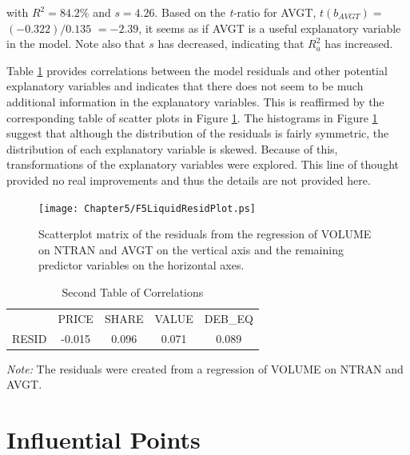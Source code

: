 \noindent with $R^2=84.2\%$ and $s=4.26$. Based on the
\textit{t-}ratio for AVGT, $t(b_{AVGT})=$ $(-0.322)/0.135$ $=-2.39$,
it seems as if AVGT is a useful explanatory variable in the model.
Note also that $s$ has decreased, indicating that $R_a^2$ has
increased.

Table \ref{T5:LiquidResidCorr2} provides correlations between the
model residuals and other potential explanatory variables and
indicates that there does not seem to be much additional information
in the explanatory variables. This is reaffirmed by the
corresponding table of scatter plots in Figure
\ref{F5:LiquidResidPlot}. The histograms in Figure
\ref{F5:LiquidResidPlot} suggest that although the distribution of
the residuals is fairly symmetric, the distribution of each
explanatory variable is skewed. Because of this, transformations of
the explanatory variables were explored. This line of thought
provided no real improvements and thus the details are not provided
here.

\begin{figure}[htp]
  \begin{center}
    \texttt{[image: Chapter5/F5LiquidResidPlot.ps]}
    \caption{\label{F5:LiquidResidPlot} \small  Scatterplot matrix of the
residuals from the regression of VOLUME on NTRAN and AVGT on the
vertical axis and the remaining predictor variables on the
horizontal axes.}
  \end{center}
\end{figure}



\begin{table}[h]

\caption{\label{T5:LiquidResidCorr2} Second Table of Correlations }
\begin{tabular}{ccccc}
\hline
& PRICE & SHARE & VALUE & DEB\_EQ \\
RESID & -0.015 & 0.096 & 0.071 & 0.089 \\ \hline
\end{tabular}

{\small \textit{Note:} The residuals were created from a regression
of VOLUME on NTRAN and AVGT.}  
\end{table}

\linejed

\section{Influential Points}

